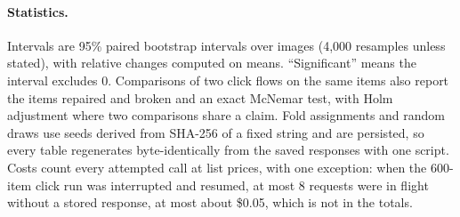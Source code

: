 \paragraph{Statistics.} Intervals are 95\% paired bootstrap intervals over images (4,000 resamples unless stated), with relative changes computed on means. ``Significant'' means the interval excludes 0. Comparisons of two click flows on the same items also report the items repaired and broken and an exact McNemar test, with Holm adjustment where two comparisons share a claim. Fold assignments and random draws use seeds derived from SHA-256 of a fixed string and are persisted, so every table regenerates byte-identically from the saved responses with one script. Costs count every attempted call at list prices, with one exception: when the 600-item click run was interrupted and resumed, at most 8 requests were in flight without a stored response, at most about \$0.05, which is not in the totals.
